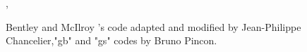 \begin{manseealso}
  ,   
\end{manseealso}

\begin{authors}
Bentley and McIlroy 's code adapted and modified by Jean-Philippe Chancelier,"gb"
and "gs" codes by Bruno Pincon.
\end{authors}
